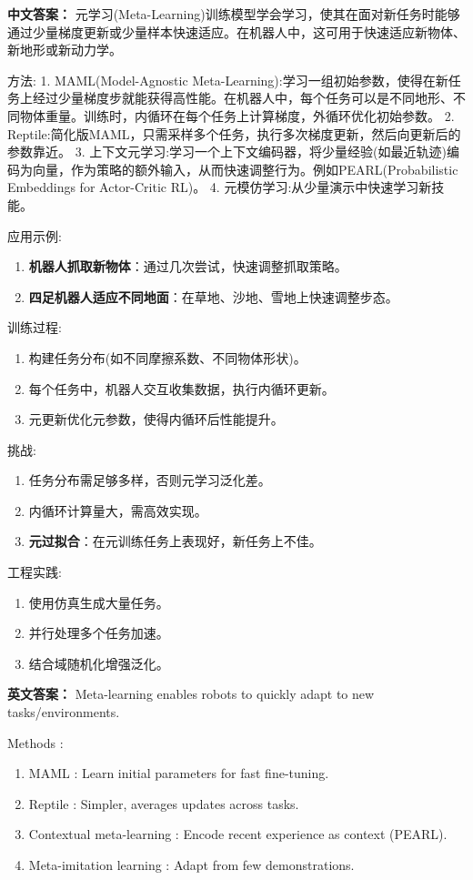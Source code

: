 \documentclass[10pt,a4paper]{ctexart}
\begin{document}
\textbf{中文答案：}  
元学习(Meta-Learning)训练模型学会学习，使其在面对新任务时能够通过少量梯度更新或少量样本快速适应。在机器人中，这可用于快速适应新物体、新地形或新动力学。

 方法:
1.  MAML(Model-Agnostic Meta-Learning):学习一组初始参数，使得在新任务上经过少量梯度步就能获得高性能。在机器人中，每个任务可以是不同地形、不同物体重量。训练时，内循环在每个任务上计算梯度，外循环优化初始参数。
2.  Reptile:简化版MAML，只需采样多个任务，执行多次梯度更新，然后向更新后的参数靠近。
3.  上下文元学习:学习一个上下文编码器，将少量经验(如最近轨迹)编码为向量，作为策略的额外输入，从而快速调整行为。例如PEARL(Probabilistic Embeddings for Actor-Critic RL)。
4.  元模仿学习:从少量演示中快速学习新技能。

 应用示例:
\begin{enumerate}
    \item \textbf{机器人抓取新物体}：通过几次尝试，快速调整抓取策略。
    \item \textbf{四足机器人适应不同地面}：在草地、沙地、雪地上快速调整步态。
\end{enumerate}

 训练过程:
\begin{enumerate}
    \item 构建任务分布(如不同摩擦系数、不同物体形状)。
    \item 每个任务中，机器人交互收集数据，执行内循环更新。
    \item 元更新优化元参数，使得内循环后性能提升。
\end{enumerate}

 挑战:
\begin{enumerate}
    \item 任务分布需足够多样，否则元学习泛化差。
    \item 内循环计算量大，需高效实现。
    \item \textbf{元过拟合}：在元训练任务上表现好，新任务上不佳。
\end{enumerate}

 工程实践:
\begin{enumerate}
    \item 使用仿真生成大量任务。
    \item 并行处理多个任务加速。
    \item 结合域随机化增强泛化。
\end{enumerate}

\textbf{英文答案：}  
Meta-learning enables robots to quickly adapt to new tasks/environments.

 Methods :
\begin{enumerate}
    \item MAML : Learn initial parameters for fast fine-tuning.
    \item Reptile : Simpler, averages updates across tasks.
    \item Contextual meta-learning : Encode recent experience as context (PEARL).
    \item Meta-imitation learning : Adapt from few demonstrations.
\end{enumerate}
\end{document}
